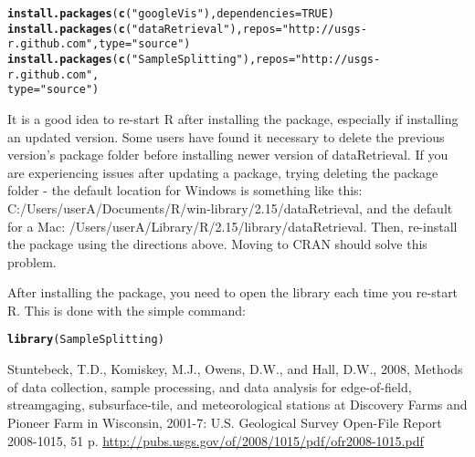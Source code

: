 \documentclass[a4paper,11pt]{article}\usepackage[]{graphicx}\usepackage[]{color}
\makeatletter
\newcommand{\hlnum}[1]{\textcolor[rgb]{0.686,0.059,0.569}{#1}}%
\newcommand{\hlstr}[1]{\textcolor[rgb]{0.192,0.494,0.8}{#1}}%
\newcommand{\hlstd}[1]{\textcolor[rgb]{0.345,0.345,0.345}{#1}}%
\newcommand{\hlkwc}[1]{\textcolor[rgb]{0.333,0.667,0.333}{#1}}%
\newcommand{\hlkwd}[1]{\textcolor[rgb]{0.737,0.353,0.396}{\textbf{#1}}}%
\newenvironment{kframe}{%
 \def\at@end@of@kframe{}%
 \ifinner\ifhmode%
  \def\at@end@of@kframe{\end{minipage}}%
  \begin{minipage}{\columnwidth}%
 \fi\fi%
 \def\FrameCommand##1{\hskip\@totalleftmargin \hskip-\fboxsep
 \colorbox{shadecolor}{##1}\hskip-\fboxsep
     \hskip-\linewidth \hskip-\@totalleftmargin \hskip\columnwidth}%
 \MakeFramed {\advance\hsize-\width
   \@totalleftmargin\z@ \linewidth\hsize
   \@setminipage}}%
 {\par\unskip\endMakeFramed%
 \at@end@of@kframe}
\newenvironment{knitrout}{}{} %
\makeatother
\begin{document}
\begin{knitrout}
\color{fgcolor}\begin{kframe}
\begin{alltt}
\hlkwd{install.packages}\hlstd{(}\hlkwd{c}\hlstd{(}\hlstr{"googleVis"}\hlstd{),} \hlkwc{dependencies}\hlstd{=}\hlnum{TRUE}\hlstd{)}
\hlkwd{install.packages}\hlstd{(}\hlkwd{c}\hlstd{(}\hlstr{"dataRetrieval"}\hlstd{),} \hlkwc{repos}\hlstd{=}\hlstr{"http://usgs-r.github.com"}\hlstd{,}\hlkwc{type}\hlstd{=}\hlstr{"source"}\hlstd{)}
\hlkwd{install.packages}\hlstd{(}\hlkwd{c}\hlstd{(}\hlstr{"SampleSplitting"}\hlstd{),}\hlkwc{repos}\hlstd{=}\hlstr{"http://usgs-r.github.com"}\hlstd{,}
                 \hlkwc{type}\hlstd{=}\hlstr{"source"}\hlstd{)}
\end{alltt}
\end{kframe}
\end{knitrout}


It is a good idea to re-start R after installing the package, especially if installing an updated version. Some users have found it necessary to delete the previous version's package folder before installing newer version of dataRetrieval. If you are experiencing issues after updating a package, trying deleting the package folder - the default location for Windows is something like this: C:/Users/userA/Documents/R/win-library/2.15/dataRetrieval, and the default for a Mac: 
/Users/userA/Library/R/2.15/library/dataRetrieval. Then, re-install the package using the directions above. Moving to CRAN should solve this problem.

After installing the package, you need to open the library each time you re-start R.  This is done with the simple command:
\begin{knitrout}
\color{fgcolor}\begin{kframe}
\begin{alltt}
\hlkwd{library}\hlstd{(SampleSplitting)}
\end{alltt}
\end{kframe}
\end{knitrout}


\clearpage

\begin{thebibliography}{10}

Stuntebeck, T.D., Komiskey, M.J., Owens, D.W., and Hall, D.W., 2008, Methods of data collection, sample processing, and data analysis for edge-of-field, streamgaging, subsurface-tile, and meteorological stations at Discovery Farms and Pioneer Farm in Wisconsin, 2001-7: U.S. Geological Survey Open-File Report 2008-1015, 51 p.
\url{http://pubs.usgs.gov/of/2008/1015/pdf/ofr2008-1015.pdf}

\end{thebibliography}
\end{document}
